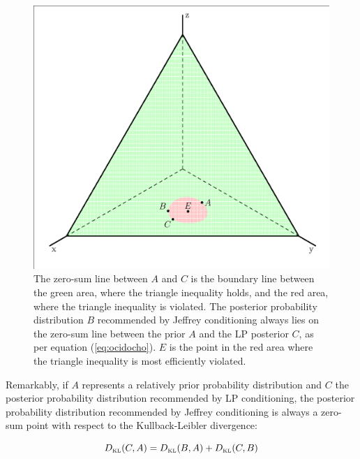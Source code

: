 \documentclass[phd,12pt,oneside]{ubcthesis}
\begin{document}
\begin{figure}[ht!]
    \begin{minipage}[h]{.7\linewidth}
      \includegraphics[width=\textwidth]{dreieck.eps}
      \caption{\footnotesize The zero-sum line between $A$ and $C$ is
        the boundary line between the green area, where the triangle
        inequality holds, and the red area, where the triangle
        inequality is violated. The posterior probability distribution
        $B$ recommended by Jeffrey conditioning always lies on the
        zero-sum line between the prior $A$ and the LP posterior $C$,
        as per equation (\ref{eq:ocidocho}). $E$ is the point in the
        red area where the triangle inequality is most efficiently
        violated.}
      \label{fig:eugoohue}
\end{minipage}
\end{figure}

Remarkably, if $A$ represents a relatively prior probability
distribution and $C$ the posterior probability distribution
recommended by LP conditioning, the posterior probability distribution
recommended by Jeffrey conditioning is always a zero-sum point with
respect to the Kullback-Leibler divergence:

\begin{equation}
  \label{eq:ocidocho}
  D_{\mbox{\tiny KL}}(C,A)=D_{\mbox{\tiny KL}}(B,A)+D_{\mbox{\tiny KL}}(C,B)
\end{equation}
\end{document}
